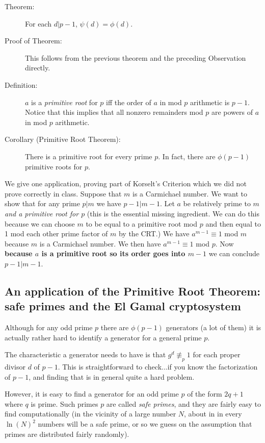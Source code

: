\documentclass[12pt]{article}
\begin{document}
\begin{description}
\item[Theorem:]   For each $d|p-1$, $\psi(d)=\phi(d)$.

\item[Proof of Theorem:]   This follows from the previous theorem and the preceding Observation directly.

\item[Definition:]  $a$ is a {\em primitive root\/} for $p$ iff the order of $a$ in mod $p$ arithmetic is $p-1$.   Notice that this implies that all nonzero remainders mod $p$ are powers of $a$ in mod $p$ arithmetic.

\item[Corollary (Primitive Root Theorem):]  There is a primitive root for every prime $p$.  In fact, there are $\phi(p-1)$ primitive roots for $p$.




\end{description}

We give one application, proving part of Korselt's Criterion which we did not prove correctly in class.   Suppose that $m$ is a Carmichael number.   We want to show that for any prime $p|m$ we have $p-1|m-1$.
Let $a$ be relatively prime to $m$ {\em and a primitive root for $p$\/} (this is the essential missing ingredient.   We can do this because we can choose $m$ to be equal to a primitive root mod $p$ and then
equal to 1 mod each other prime factor of $m$ by the CRT.)  We have $a^{m-1}\equiv 1$ mod $m$ because $m$ is a Carmichael number.  We then have $a^{m-1}\equiv 1$ mod $p$.  Now {\bf because $a$ is a primitive root so its order goes into $m-1$}
we can conclude $p-1|m-1$.

\subsection{An application of the Primitive Root Theorem:  safe primes and the El Gamal cryptosystem}

Although for any odd prime $p$ there are $\phi(p-1)$ generators (a lot of them) it is actually rather hard to identify a generator for a general prime $p$.

The characteristic a generator needs to have is that $g^d \not\equiv_p 1$ for each proper divisor $d$ of $p-1$.  This is straightforward to check...if you know the factorization of $p-1$, and finding that is in general quite a hard problem.

However, it is easy to find a generator for an odd prime $p$ of the form $2q+1$ where $q$ is prime.  Such primes $p$ are called {\em safe primes\/}, and they are fairly easy to find computationally (in the vicinity of a large number $N$, about in in every $\ln(N)^2$ numbers will be a safe prime, or so we guess on the assumption that primes are distributed fairly randomly).
\end{document}
